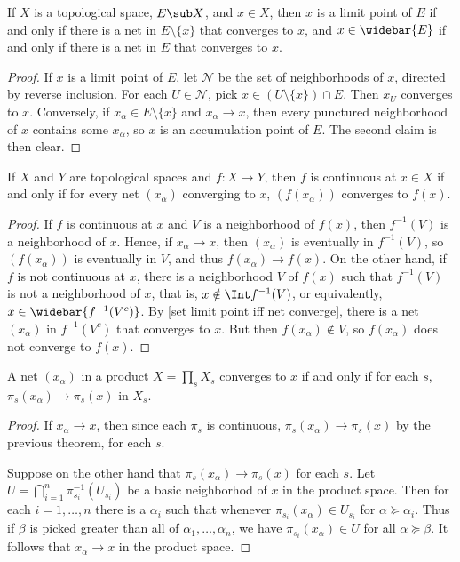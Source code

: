 \begin{proposition}\label{set limit point iff net converge}
If $X$ is a topological space, $E\sub X$, and $x\in X$, then $x$ is a limit point of $E$ if and only if there is a net in $E\setminus\{x\}$ that converges to $x$, and $x\in\widebar{E}$ if and only if there is a net in $E$ that converges to $x$.
\end{proposition}
\begin{proof}
If $x$ is a limit point of $E$, let $\mathcal{N}$ be the set of neighborhoods of $x$, directed by reverse inclusion. For each $U\in\mathcal{N}$, pick $x\in(U\setminus\{x\})\cap E$. Then $x_U$ converges to $x$. Conversely, if $x_\alpha\in E\setminus\{x\}$ and $x_\alpha\to x$, then every punctured neighborhood of $x$ contains some $x_\alpha$, so $x$ is an accumulation point of $E$. The second claim is then clear.
\end{proof}
\begin{proposition}\label{continuous iff net}
If $X$ and $Y$ are topological spaces and $f:X\to Y$, then $f$ is continuous at $x\in X$ if and only if for every net $(x_\alpha)$ converging to $x$, $(f(x_\alpha))$ converges to $f(x)$.
\end{proposition}
\begin{proof}
If $f$ is continuous at $x$ and $V$ is a neighborhood of $f(x)$, then $f^{-1}(V)$ is a neighborhood of $x$. Hence, if $x_\alpha\to x$, then $(x_\alpha)$ is eventually in $f^{-1}(V)$, so $(f(x_\alpha))$ is eventually in $V$, and thus $f(x_\alpha)\to f(x)$. On the other hand, if $f$ is not continuous at $x$, there is a neighborhood $V$ of $f(x)$ such that $f^{-1}(V)$ is not a neighborhood of $x$, that is, $x\notin\Int f^{-1}(V)$, or equivalently, $x\in\widebar{f^{-1}(V^c)}$. By \cref{set limit point iff net converge}, there is a net $(x_\alpha)$ in $f^{-1}(V^c)$ that converges to $x$. But then $f(x_\alpha)\notin V$, so $f(x_\alpha)$ does not converge to $f(x)$.
\end{proof}
\begin{proposition}\label{net in product space converge iff}
A net $(x_\alpha)$ in a product $X=\prod_s X_s$ converges to $x$ if and only if for each $s$, $\pi_s(x_\alpha)\to\pi_s(x)$ in $X_s$.
\end{proposition}
\begin{proof}
If $x_\alpha\to x$, then since each $\pi_s$ is continuous, $\pi_s(x_\alpha)\to\pi_s(x)$ by the previous theorem, for each $s$.\par
Suppose on the other hand that $\pi_s(x_\alpha)\to\pi_s(x)$ for each $s$. Let $U=\bigcap_{i=1}^{n}\pi^{-1}_{s_i}(U_{s_i})$ be a basic neighborhod of $x$ in the product space. Then for each $i=1,\dots,n$ there is a $\alpha_i$ such that whenever $\pi_{s_i}(x_\alpha)\in U_{s_i}$ for $\alpha\succeq\alpha_i$. Thus if $\beta$ is picked greater than all of $\alpha_1,\dots,\alpha_n$, we have $\pi_{s_i}(x_\alpha)\in U$ for all $\alpha\succeq\beta$. It follows that $x_\alpha\to x$ in the product space.
\end{proof}
